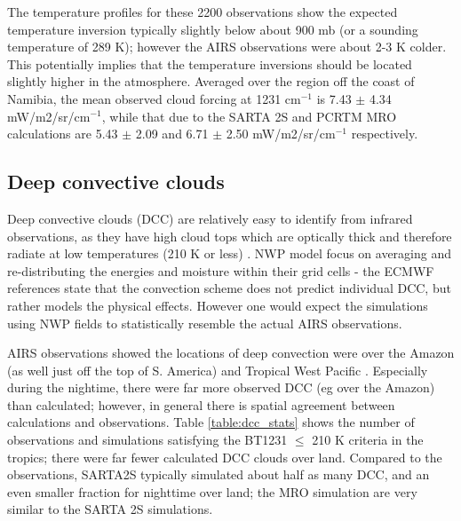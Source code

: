 \documentclass[agupp]{aguplus}              %
\newcommand{\wn}{cm$^{-1}$\xspace}
\begin{document}
\begin{article}
The temperature profiles for these 2200 observations
show the expected temperature inversion typically slightly below
about 900 mb (or a sounding temperature of 289 K); however the AIRS
observations were about 2-3 K colder. This potentially implies that
the temperature inversions should be located slightly higher in the
atmosphere. Averaged over the region off the coast of Namibia, the
mean observed cloud forcing at 1231 \wn is 7.43 $\pm$ 4.34
mW/m2/sr/\wn, while that due to the SARTA 2S and PCRTM MRO
calculations are 5.43 $\pm$ 2.09 and 6.71 $\pm$ 2.50 mW/m2/sr/\wn
respectively. 

\subsection{Deep convective clouds}

Deep convective clouds (DCC) are relatively easy to identify from
infrared observations, as they have high cloud tops which are
optically thick and therefore radiate at low temperatures (210 K or
less) \citep{aum:11}. NWP model focus on averaging and
re-distributing the energies and moisture within their grid cells -
the ECMWF references state that the convection scheme does not predict
individual DCC, but rather models the physical effects. However one
would expect the simulations using NWP fields to statistically
resemble the actual AIRS observations.

AIRS observations showed the locations of deep convection were over
the Amazon (as well just off the top of S. America) and Tropical West
Pacific . Especially during the nightime, there were far more observed
DCC (eg over the Amazon) than calculated; however, in general there is
spatial agreement between calculations and observations.  Table
\ref{table:dcc_stats} shows the number of observations and simulations
satisfying the BT1231 $\le$ 210 K criteria in the tropics; there were
far fewer calculated DCC clouds over land.  Compared to the
observations, SARTA2S typically simulated about half as many DCC, and
an even smaller fraction for nighttime over land; the MRO simulation
are very similar to the SARTA 2S simulations.


\end{article}
\end{document}
